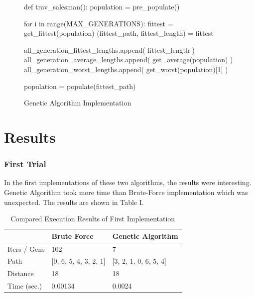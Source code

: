 \documentclass[journal,transmag]{IEEEtran}
\begin{document}
    \begin{figure}[H]
        \begin{python}
def trav_salesman():
    population = pre_populate()

    for i in range(MAX_GENERATIONS):
        fittest = get_fittest(population)
        (fittest_path, fittest_length) = fittest

        all_generation_fittest_lengths.append(
            fittest_length
        )
        all_generation_average_lengths.append(
            get_average(population)
        )
        all_generation_worst_lengths.append(
            get_worst(population)[1]
        )

        population = populate(fittest_path)
        \end{python}
        \caption{Genetic Algorithm Implementation}
    \end{figure}

    \section{Results}  \label{results}
    \subsubsection{First Trial}
    In the first implementations of these two algorithms, the results were
    interesting. Genetic Algorithm took more time than Brute-Force
    implementation which was unexpected. The results are shown in
    Table I.

    \begin{table}[H]
        \begin{center}
            \begin{tabular}{| l | l | l |}
            \hline
            & Brute Force & Genetic Algorithm \\ \hline
            Iters / Gens & 102 & 7 \\ \hline
            Path & [0, 6, 5, 4, 3, 2, 1] & [3, 2, 1, 0, 6, 5, 4] \\ \hline
            Distance & 18 & 18 \\ \hline
            Time (sec.) & 0.00134 & 0.0024 \\
            \hline
            \end{tabular}
        \end{center}
        \caption{Compared Execution Results of First Implementation}
    \end{table}
\end{document}
